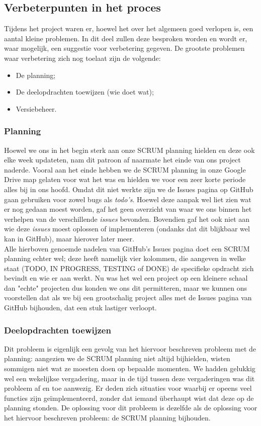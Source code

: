 \documentclass[a4paper,11pt]{article}
\begin{document}
\subsection{Verbeterpunten in het proces}
Tijdens het project waren er, hoewel het over het algemeen goed verlopen is, een aantal kleine problemen. In dit deel zullen deze besproken worden en wordt er, waar mogelijk, een suggestie voor verbetering gegeven. De grootste problemen waar verbetering zich nog toelaat zijn de volgende:
\begin{itemize}
\item De planning;
	\item De deelopdrachten toewijzen (wie doet wat);
	\item Versiebeheer.
\end{itemize}

\subsubsection{Planning}
Hoewel we ons in het begin sterk aan onze SCRUM planning hielden en deze ook elke week updateten, nam dit patroon af naarmate het einde van ons project naderde. Vooral aan het einde hebben we de SCRUM planning in onze Google Drive map gelaten voor wat het was en hielden we voor een zeer korte periode alles bij in ons hoofd. Omdat dit niet werkte zijn we de Issues pagina op GitHub gaan gebruiken voor zowel bugs als \textit{todo's}. Hoewel deze aanpak wel liet zien wat er nog gedaan moest worden, gaf het geen overzicht van waar we ons binnen het verhelpen van de verschillende \textit{issues} bevonden. Bovendien gaf het ook niet aan wie deze \textit{issues} moest oplossen of implementeren (ondanks dat dit blijkbaar wel kan in GitHub), maar hierover later meer.\\

Alle hierboven genoemde nadelen van GitHub's Issues pagina doet een SCRUM planning echter wel; deze heeft namelijk vier kolommen, die aangeven in welke staat (TODO, IN PROGRESS, TESTING of DONE) de specifieke opdracht zich bevindt en wie er aan werkt. Nu was het wel een project op een kleinere schaal dan "echte" projecten dus konden we ons dit permitteren, maar we kunnen ons voorstellen dat als we bij een grootschalig project alles met de Issues pagina van GitHub bijhouden, dat een stuk lastiger verloopt.

\subsubsection{Deelopdrachten toewijzen}
Dit probleem is eigenlijk een gevolg van het hiervoor beschreven probleem met de planning: aangezien we de SCRUM planning niet altijd bijhielden, wisten sommigen niet wat ze moesten doen op bepaalde momenten. We hadden gelukkig wel een wekelijkse vergadering, maar in de tijd tussen deze vergaderingen was dit probleem af en toe aanwezig. Er deden zich situaties voor waarbij er opeens veel functies zijn ge\"{i}mplementeerd, zonder dat iemand überhaupt wist dat deze op de planning stonden. De oplossing voor dit probleem is dezelfde als de oplossing voor het hiervoor beschreven probleem: de SCRUM planning bijhouden.
\end{document}
